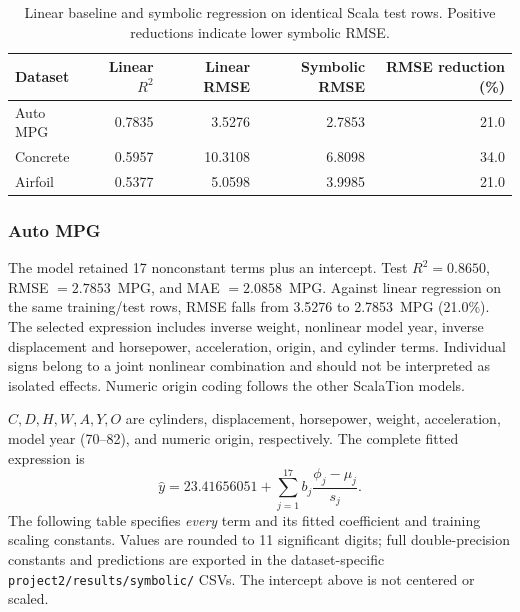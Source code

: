 \documentclass{article}
\begin{document}
\begin{table}[H]
\centering\small
\caption{Linear baseline and symbolic regression on identical Scala test rows. Positive reductions indicate lower symbolic RMSE.}
\label{tab:symbolic-baseline}
\begin{tabular}{lrrrr}
\toprule
Dataset & Linear $R^2$ & Linear RMSE & Symbolic RMSE & RMSE reduction (\%) \\
\midrule
Auto MPG & 0.7835 & 3.5276 & 2.7853 & 21.0 \\
Concrete & 0.5957 & 10.3108 & 6.8098 & 34.0 \\
Airfoil & 0.5377 & 5.0598 & 3.9985 & 21.0 \\
\bottomrule
\end{tabular}
\end{table}

\subsubsection{Auto MPG}

The model retained 17 nonconstant terms plus an intercept. Test $R^2=0.8650$, RMSE $=2.7853$~MPG, and MAE $=2.0858$~MPG. Against linear regression on the same training/test rows, RMSE falls from 3.5276 to 2.7853~MPG (21.0\%). The selected expression includes inverse weight, nonlinear model year, inverse displacement and horsepower, acceleration, origin, and cylinder terms. Individual signs belong to a joint nonlinear combination and should not be interpreted as isolated effects. Numeric origin coding follows the other ScalaTion models.

$C,D,H,W,A,Y,O$ are cylinders, displacement, horsepower, weight, acceleration, model year (70--82), and numeric origin, respectively.
The complete fitted expression is
\begin{equation}
\widehat{y}= 23.41656051 + \sum_{j=1}^{17} b_j\frac{\phi_j-\mu_j}{s_j}.
\end{equation}
The following table specifies \emph{every} term and its fitted coefficient and training scaling constants. Values are rounded to 11 significant digits; full double-precision constants and predictions are exported in the dataset-specific \texttt{project2/results/symbolic/} CSVs. The intercept above is not centered or scaled.
\end{document}
